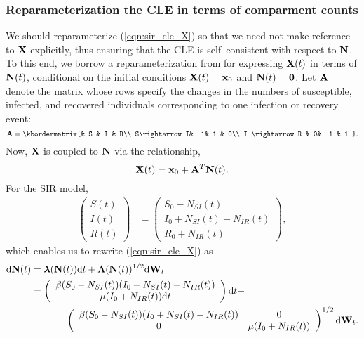 \subsubsection{Reparameterization the CLE in terms of comparment counts}
\label{subsubsec:cle_repar}
We should reparameterize (\ref{eqn:sir_cle_X}) so that we need not make reference to $ \mathbf{X} $ explicitly, thus ensuring that the CLE is self--consistent with respect to $ \mathbf{N} $. To this end, we borrow a reparameterization from \cite{breto2009time,ho2016direct} for expressing $ \mathbf{X} (t)$ in terms of $ \mathbf{N}(t) $, conditional on the initial conditions $ \mathbf{X}(t) = \mathbf{x}_0 $ and $ \mathbf{N}(t) = \boldsymbol{0} $. Let $ \mathbf{A} $ denote the matrix whose rows specify the changes in the numbers of susceptible, infected, and recovered individuals corresponding to one infection or recovery event:
\begin{equation}
\label{eqn:sir_stoich}
\bA = \kbordermatrix{& S & I &  R\\
	S\rightarrow I& -1& 1 & 0\\
	I \rightarrow R & 0& -1 & 1
}.
\end{equation}
Now, $ \mathbf{X} $ is coupled to $ \mathbf{N} $ via the relationship,
\begin{equation}
\label{eqn:incid2prev}
\mathbf{X}(t) = \mathbf{x}_0 + \mathbf{A}^T\mathbf{N}(t).
\end{equation}
For the SIR model, 
\begin{align}
\left (\begin{array}{c}
S(t) \\
I(t) \\
R(t)
\end{array}\right ) &= \left (\begin{array}{c}
S_0 - N_{SI}(t) \\
I_0 + N_{SI}(t) - N_{IR}(t) \\
R_0 + N_{IR}(t)
\end{array}\right ),
\end{align}
which enables us to rewrite (\ref{eqn:sir_cle_X}) as
\begin{align}\small
\label{eqn:sir_cle_N}
 \mathrm{d}\mathbf{N}(t)&= \boldsymbol{\lambda}(\mathbf{N}(t))\mathrm{d} t + \boldsymbol{\Lambda}(\mathbf{N}(t))^{1/2}\mathrm{d}\mathbf{W}_t \\
 &= \left (\begin{array}{cc}
\beta (S_0 - N_{SI}(t))(I_0 + N_{SI}(t) - N_{IR}(t))\\
\mu(I_0 + N_{IR}(t))\mathrm{d} t 
\end{array}\right )\mathrm{d} t + \nonumber\\
&\hspace{0.5in}\left(\begin{array}{cc}
\beta (S_0 - N_{SI}(t))(I_0 + N_{SI}(t) - N_{IR}(t)) & 0 \\
0 & \mu(I_0 + N_{IR}(t))
\end{array}\right)^{1/2}\mathrm{d}\mathbf{W}_t. \nonumber 
\end{align}

